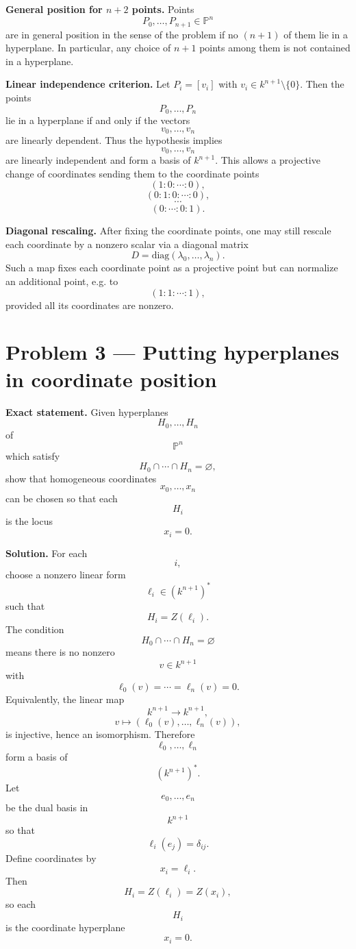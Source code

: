 \documentclass[12pt,a4paper]{article}
\theoremstyle{plain}
\theoremstyle{definition}      %
\begin{document}
\textbf{General position for $n+2$ points.}
Points
\[
P_0,\dots,P_{n+1}\in \mathbb{P}^n
\]
are in general position in the sense of the problem if no $(n+1)$ of them lie in a hyperplane.
In particular, any choice of $n+1$ points among them is not contained in a hyperplane.

\textbf{Linear independence criterion.}
Let $P_i=[v_i]$ with $v_i\in k^{n+1}\setminus\{0\}$.
Then the points
\[
P_0,\dots,P_n
\]
lie in a hyperplane if and only if the vectors
\[
v_0,\dots,v_n
\]
are linearly dependent.
Thus the hypothesis implies
\[
v_0,\dots,v_n
\]
are linearly independent and form a basis of $k^{n+1}$.
This allows a projective change of coordinates sending them to the coordinate points
\[
(1:0:\cdots:0),
\]
\[
(0:1:0:\cdots:0),
\]
\[
\cdots
\]
\[
(0:\cdots:0:1).
\]

\textbf{Diagonal rescaling.}
After fixing the coordinate points, one may still rescale each coordinate by a nonzero scalar via a diagonal matrix
\[
D=\mathrm{diag}(\lambda_0,\dots,\lambda_n).
\]
Such a map fixes each coordinate point as a projective point but can normalize an additional point, e.g. to
\[
(1:1:\cdots:1),
\]
provided all its coordinates are nonzero.


\bigskip

\section*{Problem 3 — Putting hyperplanes in coordinate position}

\textbf{Exact statement.}
Given hyperplanes
\[
H_0,\dots,H_n
\]
of
\[
\mathbb{P}^n
\]
which satisfy
\[
H_0\cap\cdots\cap H_n
=
\varnothing,
\]
show that homogeneous coordinates
\[
x_0,\dots,x_n
\]
can be chosen so that each
\[
H_i
\]
is the locus
\[
x_i=0.
\]

\textbf{Solution.}
For each
\[
i,
\]
choose a nonzero linear form
\[
\ell_i\in (k^{n+1})^*
\]
such that
\[
H_i
=
Z(\ell_i).
\]
The condition
\[
H_0\cap\cdots\cap H_n
=
\varnothing
\]
means there is no nonzero
\[
v\in k^{n+1}
\]
with
\[
\ell_0(v)=\cdots=\ell_n(v)=0.
\]
Equivalently, the linear map
\[
k^{n+1}\to k^{n+1},
\]
\[
v\mapsto (\ell_0(v),\dots,\ell_n(v)),
\]
is injective, hence an isomorphism.
Therefore
\[
\ell_0,\dots,\ell_n
\]
form a basis of
\[
(k^{n+1})^{*}.
\]
Let
\[
e_0,\dots,e_n
\]
be the dual basis in
\[
k^{n+1}
\]
so that
\[
\ell_i(e_j)=\delta_{ij}.
\]
Define coordinates by
\[
x_i=\ell_i.
\]
Then
\[
H_i
=
Z(\ell_i)
=
Z(x_i),
\]
so each
\[
H_i
\]
is the coordinate hyperplane
\[
x_i=0.
\]
\end{document}
